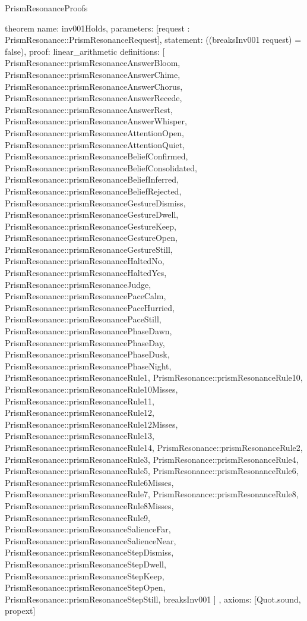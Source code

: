 \begin{lexlean}{PrismResonanceProofs}
\begin{semanticmodule}
theorem{
  name: inv001Holds,
  parameters: [request : PrismResonance::PrismResonanceRequest],
  statement: ((breaksInv001 request) = false),
  proof: linear_arithmetic{
    definitions: [
      PrismResonance::prismResonanceAnswerBloom,
      PrismResonance::prismResonanceAnswerChime,
      PrismResonance::prismResonanceAnswerChorus,
      PrismResonance::prismResonanceAnswerRecede,
      PrismResonance::prismResonanceAnswerRest,
      PrismResonance::prismResonanceAnswerWhisper,
      PrismResonance::prismResonanceAttentionOpen,
      PrismResonance::prismResonanceAttentionQuiet,
      PrismResonance::prismResonanceBeliefConfirmed,
      PrismResonance::prismResonanceBeliefConsolidated,
      PrismResonance::prismResonanceBeliefInferred,
      PrismResonance::prismResonanceBeliefRejected,
      PrismResonance::prismResonanceGestureDismiss,
      PrismResonance::prismResonanceGestureDwell,
      PrismResonance::prismResonanceGestureKeep,
      PrismResonance::prismResonanceGestureOpen,
      PrismResonance::prismResonanceGestureStill,
      PrismResonance::prismResonanceHaltedNo,
      PrismResonance::prismResonanceHaltedYes,
      PrismResonance::prismResonanceJudge,
      PrismResonance::prismResonancePaceCalm,
      PrismResonance::prismResonancePaceHurried,
      PrismResonance::prismResonancePaceStill,
      PrismResonance::prismResonancePhaseDawn,
      PrismResonance::prismResonancePhaseDay,
      PrismResonance::prismResonancePhaseDusk,
      PrismResonance::prismResonancePhaseNight,
      PrismResonance::prismResonanceRule1,
      PrismResonance::prismResonanceRule10,
      PrismResonance::prismResonanceRule10Misses,
      PrismResonance::prismResonanceRule11,
      PrismResonance::prismResonanceRule12,
      PrismResonance::prismResonanceRule12Misses,
      PrismResonance::prismResonanceRule13,
      PrismResonance::prismResonanceRule14,
      PrismResonance::prismResonanceRule2,
      PrismResonance::prismResonanceRule3,
      PrismResonance::prismResonanceRule4,
      PrismResonance::prismResonanceRule5,
      PrismResonance::prismResonanceRule6,
      PrismResonance::prismResonanceRule6Misses,
      PrismResonance::prismResonanceRule7,
      PrismResonance::prismResonanceRule8,
      PrismResonance::prismResonanceRule8Misses,
      PrismResonance::prismResonanceRule9,
      PrismResonance::prismResonanceSalienceFar,
      PrismResonance::prismResonanceSalienceNear,
      PrismResonance::prismResonanceStepDismiss,
      PrismResonance::prismResonanceStepDwell,
      PrismResonance::prismResonanceStepKeep,
      PrismResonance::prismResonanceStepOpen,
      PrismResonance::prismResonanceStepStill,
      breaksInv001
    ]
  },
  axioms: [Quot.sound, propext]
}


\end{semanticmodule}
\end{lexlean}
